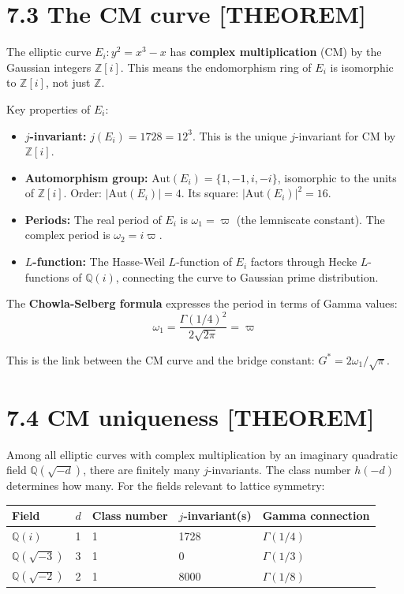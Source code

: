 \documentclass[
  11pt,
  letterpaper,
  twoside,
  openright]{book}
\providecommand{\tightlist}{%
  \setlength{\itemsep}{0pt}\setlength{\parskip}{0pt}}
\begin{document}
\section{7.3 The CM curve {[}THEOREM{]}}\label{the-cm-curve-theorem}

The elliptic curve \(E_i: y^2 = x^3 - x\) has \textbf{complex
multiplication} (CM) by the Gaussian integers \(\mathbb{Z}[i]\). This
means the endomorphism ring of \(E_i\) is isomorphic to
\(\mathbb{Z}[i]\), not just \(\mathbb{Z}\).

Key properties of \(E_i\):

\begin{itemize}
\tightlist
\item
  \textbf{\(j\)-invariant:} \(j(E_i) = 1728 = 12^3\). This is the unique
  \(j\)-invariant for CM by \(\mathbb{Z}[i]\).
\item
  \textbf{Automorphism group:} \(\text{Aut}(E_i) = \{1, -1, i, -i\}\),
  isomorphic to the units of \(\mathbb{Z}[i]\). Order:
  \(|\text{Aut}(E_i)| = 4\). Its square: \(|\text{Aut}(E_i)|^2 = 16\).
\item
  \textbf{Periods:} The real period of \(E_i\) is \(\omega_1 = \varpi\)
  (the lemniscate constant). The complex period is
  \(\omega_2 = i\varpi\).
\item
  \textbf{\(L\)-function:} The Hasse-Weil \(L\)-function of \(E_i\)
  factors through Hecke \(L\)-functions of \(\mathbb{Q}(i)\), connecting
  the curve to Gaussian prime distribution.
\end{itemize}

The \textbf{Chowla-Selberg formula} expresses the period in terms of
Gamma values: \[
\omega_1 = \frac{\Gamma(1/4)^2}{2\sqrt{2\pi}} = \varpi
\tag{7.4}
\]

This is the link between the CM curve and the bridge constant:
\(G^* = 2\omega_1/\sqrt{\pi}\).

\section{7.4 CM uniqueness {[}THEOREM{]}}\label{cm-uniqueness-theorem}

Among all elliptic curves with complex multiplication by an imaginary
quadratic field \(\mathbb{Q}(\sqrt{-d})\), there are finitely many
\(j\)-invariants. The class number \(h(-d)\) determines how many. For
the fields relevant to lattice symmetry:

\begin{longtable}[]{@{}lllll@{}}
\toprule\noalign{}
Field & \(d\) & Class number & \(j\)-invariant(s) & Gamma connection \\
\midrule\noalign{}
\endhead
\bottomrule\noalign{}
\endlastfoot
\(\mathbb{Q}(i)\) & 1 & 1 & 1728 & \(\Gamma(1/4)\) \\
\(\mathbb{Q}(\sqrt{-3})\) & 3 & 1 & 0 & \(\Gamma(1/3)\) \\
\(\mathbb{Q}(\sqrt{-2})\) & 2 & 1 & 8000 & \(\Gamma(1/8)\) \\
\end{longtable}
\end{document}
